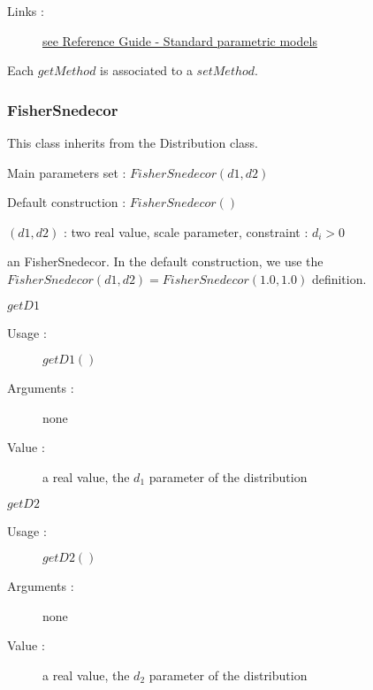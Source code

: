 \begin{description}
\begin{description}
  \end{description}

\item[Links :]  \rule{0pt}{1em}
  \href{OpenTURNS_ReferenceGuide.pdf}{see Reference Guide - Standard parametric models}
\end{description}

Each  $getMethod$  is associated to a $setMethod$.

\newpage \subsubsection{FisherSnedecor}


This class inherits from the Distribution class.

\begin{description}

\item[Usage :]
  \begin{description}
  \item Main parameters set : $FisherSnedecor(d1,d2)$
  \item Default construction : $FisherSnedecor( )$
  \end{description}

\item[Arguments :]  \rule{0pt}{1em}
  \begin{description}
  \item $(d1,d2)$ : two  real value, scale parameter, constraint : $d_i > 0 $
  \end{description}

\item[Value :] an FisherSnedecor. In the default construction, we use the $FisherSnedecor(d1,d2) = FisherSnedecor(1.0, 1.0)$ definition.

\item[Some methods :]  \rule{0pt}{1em}
  \begin{description}

  \item $getD1$
    \begin{description}
    \item[Usage :] $getD1()$
    \item[Arguments :] none
    \item[Value :]  a real value, the $d_1$ parameter of the  distribution
    \end{description}
    \bigskip

  \item $getD2$
    \begin{description}
    \item[Usage :] $getD2()$
    \item[Arguments :] none
    \item[Value :]  a real value, the $d_2$ parameter of the  distribution
    \end{description}
    \bigskip


\end{description}
\end{description}
